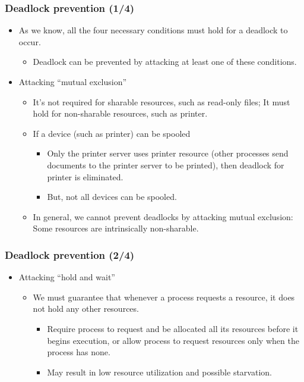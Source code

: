 \documentclass[CJKutf8,xcolor=pdftex,dvipsnames,table]{beamer}
\begin{document}
\begin{CJK*}{UTF8}{song}
  \begin{frame}
  \frametitle{Deadlock prevention (1/4)} \pause
  \begin{itemize}
  \item{As we know, all the four necessary conditions must hold for a deadlock to occur.} \pause
    \begin{itemize}
    \item{Deadlock can be prevented by attacking at least one of these conditions.} \pause
    \end{itemize}
  \item{Attacking ``mutual exclusion''} \pause
    \begin{itemize}
    \item{It's not required for sharable resources, such as read-only files; \pause It must hold for non-sharable resources, such as printer.} \pause
    \item{If a device (such as printer) can be spooled} \pause
      \begin{itemize}
      \item{Only the printer server uses printer resource (other processes send documents to the printer server to be printed), then deadlock for printer is eliminated.} \pause
      \item{But, not all devices can be spooled.} \pause
      \end{itemize}
    \item{In general, we cannot prevent deadlocks by attacking mutual exclusion: Some resources are intrinsically non-sharable.}
    \end{itemize}
  \end{itemize}
  \end{frame}

  \begin{frame}
  \frametitle{Deadlock prevention (2/4)} \pause
  \begin{itemize}
  \item{Attacking ``hold and wait''} \pause
    \begin{itemize}
    \item{We must guarantee that whenever a process requests a resource, it does not hold any other resources.} \pause
      \begin{itemize}
      \item{Require process to request and be allocated all its resources before it begins execution, \pause or allow process to request resources only when the process has none.} \pause
      \item{May result in low resource utilization and possible starvation.}
      \end{itemize}
    \end{itemize}
  \end{itemize}
  \end{frame}


\end{CJK*}
\end{document}
